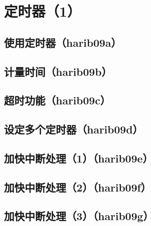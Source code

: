 ﻿\chapter{	定时器（1）	}
\section{	使用定时器（harib09a）	}
\section{	计量时间（harib09b）	}
\section{	超时功能（harib09c）	}
\section{	设定多个定时器（harib09d）	}
\section{	加快中断处理（1）（harib09e）	}
\section{	加快中断处理（2）（harib09f）	}
\section{	加快中断处理（3）（harib09g）	}

